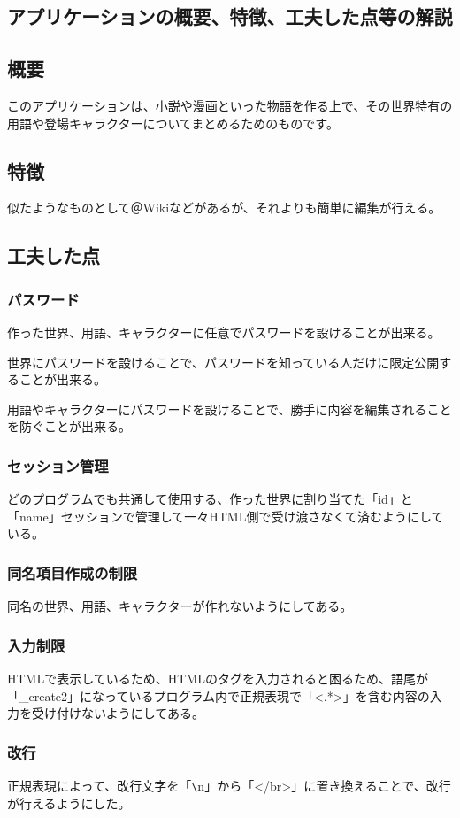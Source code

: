 \documentclass[12pt,a4paper]{jarticle}
\begin{document}
\begin{ttfamily}

\section{アプリケーションの概要、特徴、工夫した点等の解説}
\subsection{概要}
このアプリケーションは、小説や漫画といった物語を作る上で、その世界特有の用語や登場キャラクターについてまとめるためのものです。
\subsection{特徴}
似たようなものとして＠Wikiなどがあるが、それよりも簡単に編集が行える。
\subsection{工夫した点}
\subsubsection{パスワード}
作った世界、用語、キャラクターに任意でパスワードを設けることが出来る。
\par 世界にパスワードを設けることで、パスワードを知っている人だけに限定公開することが出来る。
\par 用語やキャラクターにパスワードを設けることで、勝手に内容を編集されることを防ぐことが出来る。
\subsubsection{セッション管理}
どのプログラムでも共通して使用する、作った世界に割り当てた「id」と「name」セッションで管理して一々HTML側で受け渡さなくて済むようにしている。
\subsubsection{同名項目作成の制限}
同名の世界、用語、キャラクターが作れないようにしてある。
\subsubsection{入力制限}
HTMLで表示しているため、HTMLのタグを入力されると困るため、語尾が「\_create2」になっているプログラム内で正規表現で「<.*>」を含む内容の入力を受け付けないようにしてある。
\subsubsection{改行}
正規表現によって、改行文字を「\verb|\|n」から「</br>」に置き換えることで、改行が行えるようにした。


\end{ttfamily}
\end{document}
